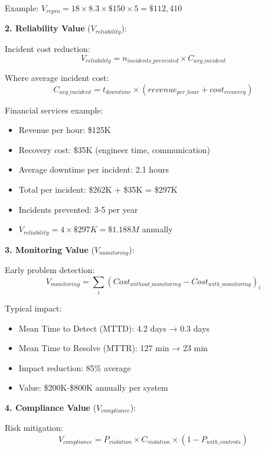 Example: $V_{repro} = 18 \times 8.3 \times \$150 \times 5 = \$112,410$

\textbf{2. Reliability Value} ($V_{reliability}$):

Incident cost reduction:
\begin{equation}
V_{reliability} = n_{incidents\_prevented} \times C_{avg\_incident}
\end{equation}

Where average incident cost:
\begin{equation}
C_{avg\_incident} = t_{downtime} \times (revenue_{per\_hour} + cost_{recovery})
\end{equation}

Financial services example:
\begin{itemize}
    \item Revenue per hour: \$125K
    \item Recovery cost: \$35K (engineer time, communication)
    \item Average downtime per incident: 2.1 hours
    \item Total per incident: \$262K + \$35K = \$297K
    \item Incidents prevented: 3-5 per year
    \item $V_{reliability} = 4 \times \$297K = \$1.188M$ annually
\end{itemize}

\textbf{3. Monitoring Value} ($V_{monitoring}$):

Early problem detection:
\begin{equation}
V_{monitoring} = \sum_{i} (Cost_{without\_monitoring} - Cost_{with\_monitoring})_i
\end{equation}

Typical impact:
\begin{itemize}
    \item Mean Time to Detect (MTTD): 4.2 days → 0.3 days
    \item Mean Time to Resolve (MTTR): 127 min → 23 min
    \item Impact reduction: 85\% average
    \item Value: \$200K-\$800K annually per system
\end{itemize}

\textbf{4. Compliance Value} ($V_{compliance}$):

Risk mitigation:
\begin{equation}
V_{compliance} = P_{violation} \times C_{violation} \times (1 - P_{with\_controls})
\end{equation}

